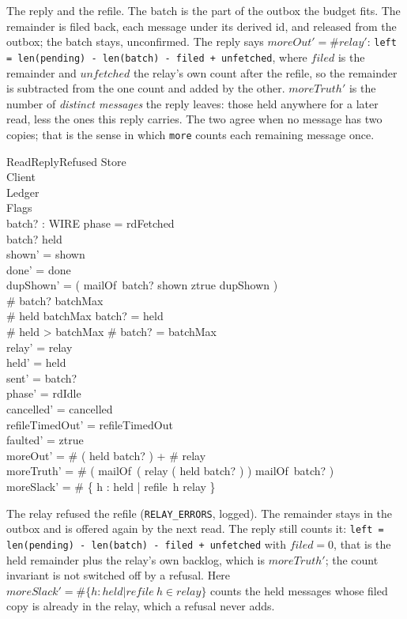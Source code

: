 \documentclass[a4paper,10pt,fleqn]{article}
\begin{document}
The reply and the refile.  The batch is the part of the outbox the budget
fits.  The remainder is filed back, each message under its derived id, and
released from the outbox; the batch stays, unconfirmed.  The reply says
$moreOut' = \# relay'$: \texttt{left = len(pending) - len(batch) - filed +
unfetched}, where $filed$ is the remainder and $unfetched$ the relay's own
count after the refile, so the remainder is subtracted from the one count and
added by the other.  $moreTruth'$ is the number of \emph{distinct messages} the
reply leaves: those held anywhere for a later read, less the ones this
reply carries.  The two agree when no message has two copies; that is the
sense in which \texttt{more} counts each remaining message once.

\begin{schema}{ReadReplyRefused}
  \Delta Store \\
  \Delta Client \\
  \Xi Ledger \\
  \Delta Flags \\
  batch? : \power WIRE
  \where
  phase = rdFetched \\
  batch? \subseteq held \\
  shown' = shown \\
  done' = done \\
  dupShown' = ( \IF mailOf~batch? \cap shown \neq \emptyset \THEN ztrue \ELSE dupShown ) \\
  \# batch? \leq batchMax \\
  \# held \leq batchMax \implies batch? = held \\
  \# held > batchMax \implies \# batch? = batchMax \\
  relay' = relay \\
  held' = held \\
  sent' = batch? \\
  phase' = rdIdle \\
  cancelled' = cancelled \\
  refileTimedOut' = refileTimedOut \\
  faulted' = ztrue \\
  moreOut' = \# ( held \setminus batch? ) + \# relay \\
  moreTruth' = \# ( mailOf~( relay \cup ( held \setminus batch? ) ) \setminus
    mailOf~batch? ) \\
  moreSlack' = \# \{ h : held | refile~h \in relay \}
\end{schema}

The relay refused the refile (\texttt{RELAY\_ERRORS}, logged).  The remainder
stays in the outbox and is offered again by the next read.  The reply still
counts it: \texttt{left = len(pending) - len(batch) - filed + unfetched} with
$filed = 0$, that is the held remainder plus the relay's own backlog, which is
$moreTruth'$; the count invariant is not switched off by a refusal.  Here
$moreSlack' = \# \{ h : held | refile~h \in relay \}$ counts the held messages
whose filed copy is already in the relay, which a refusal never adds.
\end{document}
